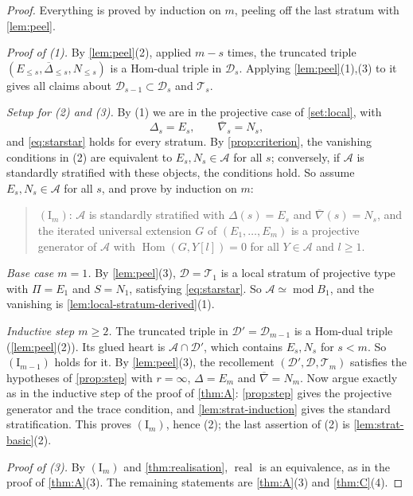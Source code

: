 \documentclass[11pt,reqno]{amsart}
\theoremstyle{plain}
\theoremstyle{definition}
\theoremstyle{remark}
\DeclareMathOperator{\Hom}{Hom}
\DeclareMathOperator{\real}{real}
\newcommand{\modd}{\operatorname{mod}}
\newcommand{\nablabar}{\overline{\nabla}}
\newcommand{\Deltabar}{\overline{\Delta}}
\newcommand{\cD}{\mathcal{D}}
\newcommand{\cA}{\mathcal{A}}
\newcommand{\cT}{\mathcal{T}}
\begin{document}
\begin{proof}
Everything is proved by induction on $m$, peeling off the last stratum with \cref{lem:peel}.

\emph{Proof of (1).} By \cref{lem:peel}(2), applied $m-s$ times, the truncated triple $(E_{\le s},\Deltabar_{\le s},N_{\le s})$ is a Hom-dual triple in $\cD_s$. Applying \cref{lem:peel}(1),(3) to it gives all claims about $\cD_{s-1}\subset\cD_s$ and $\cT_s$.

\emph{Setup for (2) and (3).} By (1) we are in the projective case of \cref{set:local}, with
\[\Delta_s=E_s,\qquad\nablabar_s=N_s,\]
and \eqref{eq:starstar} holds for every stratum. By \cref{prop:criterion}, the vanishing conditions in (2) are equivalent to $E_s,N_s\in\cA$ for all $s$; conversely, if $\cA$ is standardly stratified with these objects, the conditions hold. So assume $E_s,N_s\in\cA$ for all $s$, and prove by induction on $m$:
\begin{quote}
$(\mathrm{I}_m)$: $\cA$ is standardly stratified with $\Delta(s)=E_s$ and $\nablabar(s)=N_s$, and the iterated universal extension $G$ of $(E_1,\dots,E_m)$ is a projective generator of $\cA$ with $\Hom(G,Y[l])=0$ for all $Y\in\cA$ and $l\ge1$.
\end{quote}

\emph{Base case $m=1$.} By \cref{lem:peel}(3), $\cD=\cT_1$ is a local stratum of projective type with $\Pi=E_1$ and $S=N_1$, satisfying \eqref{eq:starstar}. So $\cA\simeq\modd B_1$, and the vanishing is \cref{lem:local-stratum-derived}(1).

\emph{Inductive step $m\ge2$.} The truncated triple in $\cD'=\cD_{m-1}$ is a Hom-dual triple (\cref{lem:peel}(2)). Its glued heart is $\cA\cap\cD'$, which contains $E_s,N_s$ for $s<m$. So $(\mathrm I_{m-1})$ holds for it. By \cref{lem:peel}(3), the recollement $(\cD',\cD,\cT_m)$ satisfies the hypotheses of \cref{prop:step} with $r=\infty$, $\Delta=E_m$ and $\nablabar=N_m$. Now argue exactly as in the inductive step of the proof of \cref{thm:A}: \cref{prop:step} gives the projective generator and the trace condition, and \cref{lem:strat-induction} gives the standard stratification. This proves $(\mathrm I_m)$, hence (2); the last assertion of (2) is \cref{lem:strat-basic}(2).

\emph{Proof of (3).} By $(\mathrm I_m)$ and \cref{thm:realisation}, $\real$ is an equivalence, as in the proof of \cref{thm:A}(3). The remaining statements are \cref{thm:A}(3) and \cref{thm:C}(4).
\end{proof}
\end{document}
